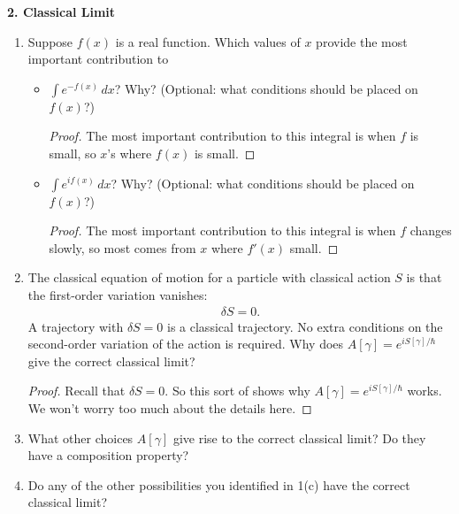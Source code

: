 \documentclass{book}
\theoremstyle{definition}
\begin{document}
\noindent \textbf{2. Classical Limit}
\begin{enumerate}
	\item Suppose $f(x)$ is a real function. Which values of $x$ provide the most important contribution to 
	\begin{itemize}
		\item $\int e^{-f(x)}\,dx$? Why? (Optional: what conditions should be placed on $f(x)$?)
		
		
		\begin{proof}
			The most important contribution to this integral is when $f$ is small, so $x$'s where $f(x)$ is small. 
		\end{proof}
	
	
		\item $\int e^{if(x)}\,dx$? Why? (Optional: what conditions should be placed on $f(x)$?)
		
		
		\begin{proof}
			The most important contribution to this integral is when $f$ changes slowly, so most comes from $x$ where $f'(x)$ small. 
		\end{proof}
	\end{itemize}



	\item The classical equation of motion for a particle with classical action $S$ is that the first-order variation vanishes:
	\begin{align}
	\delta S = 0.
	\end{align}
	A trajectory with $\delta S = 0$ is a classical trajectory. No extra conditions on the second-order variation of the action is required. Why does $A[\gamma] = e^{iS[\gamma]/\hbar}$ give the correct classical limit? 
	
	\begin{proof}
		Recall that $\delta S = 0$. So this sort of shows why $A[\gamma] = e^{iS[\gamma]/\hbar}$ works. We won't worry too much about the details here.
		
	\end{proof}
	
	\item What other choices $A[\gamma]$ give rise to the correct classical limit? Do they have a composition property? 
	
	\item Do any of the other possibilities you identified in 1(c) have the correct classical limit? 
\end{enumerate}
\end{document}
